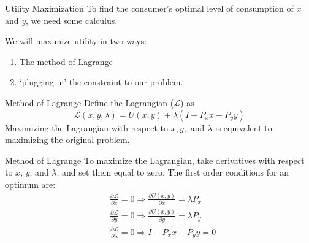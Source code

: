 \documentclass{beamer}
\begin{document}

\begin{frame}{Utility Maximization}
  To find the consumer's optimal level of consumption of $x$  and $y$, we need some calculus.

  \bigskip
  We will maximize utility in two-ways:
  \begin{enumerate}
    \item The method of Lagrange

    \item `plugging-in' the constraint to our problem.
  \end{enumerate} 
\end{frame}

\begin{frame}{Method of Lagrange}
  Define the Lagrangian ($\mathcal{L}$) as
  $$
    \mathcal{L}(x,y,\lambda) = U(x,y) + \lambda(I-P_x x - P_y y)
  $$
  \bigskip
  Maximizing the Lagrangian with respect to $x, y,$ and $\lambda$ is equivalent to maximizing the original problem.
\end{frame}

\begin{frame}{Method of Lagrange}
  To maximize the Lagrangian, take derivatives with respect to $x$, $y$, and $\lambda$, and set them equal to zero. The first order conditions for an optimum are:
  \begin{align*}
    &\frac{\partial \mathcal{L}}{\partial x}=0 \Rightarrow \frac{\partial U(x,y)}{\partial x} = \lambda P_x \\
    &\frac{\partial \mathcal{L}}{\partial y}=0 \Rightarrow \frac{\partial U(x,y)}{\partial y} = \lambda P_y \\
    &\frac{\partial \mathcal{L}}{\partial \lambda}=0 \Rightarrow I - P_x x - P_y y = 0
  \end{align*}
\end{frame}
\end{document}

